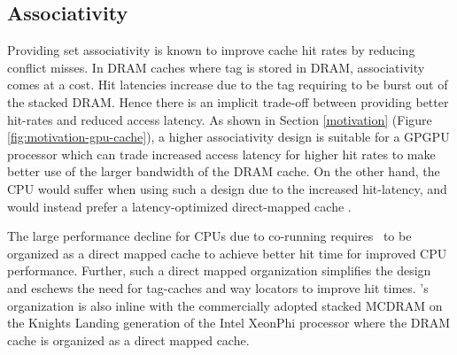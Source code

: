 \subsection{Associativity} 
Providing set associativity is known to improve cache hit rates by reducing conflict misses. In DRAM caches where tag is stored in DRAM,  associativity comes at a cost. Hit latencies increase due to the tag requiring to be burst out of the stacked DRAM. Hence there is an implicit trade-off between providing better hit-rates and reduced access latency. As shown in Section \ref{motivation} (Figure \ref{fig:motivation-gpu-cache}), a higher associativity design is suitable for a GPGPU processor which can trade increased access latency for higher hit rates to make better use of the larger bandwidth of the DRAM cache. On the other hand, the CPU would suffer when using such a design due to the increased hit-latency, and  would instead prefer a latency-optimized direct-mapped cache \cite{alloy}.
\par The large performance decline for CPUs due to co-running requires \cachename\ to be organized as a direct mapped cache to achieve better hit time for improved CPU performance. Further, such a direct mapped organization simplifies the design and eschews the need for tag-caches \cite{atcache} and way locators \cite{bimodal} to improve hit times. \cachename's organization is also inline with the commercially adopted stacked MCDRAM on the Knights Landing generation of the Intel XeonPhi processor \cite{xeonphi} where the DRAM cache is organized as a direct mapped cache.

